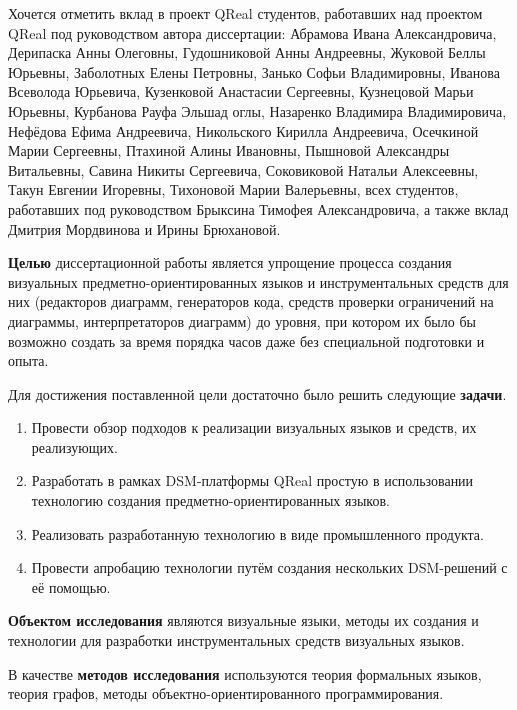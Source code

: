 Хочется отметить вклад в проект QReal студентов, работавших над проектом QReal под руководством автора 
диссертации: Абрамова Ивана Александровича, Дерипаска Анны Олеговны, Гудошниковой Анны Андреевны, 
Жуковой Беллы Юрьевны, Заболотных Елены Петровны, Занько Софьи Владимировны, Иванова Всеволода Юрьевича, 
Кузенковой Анастасии Сергеевны, Кузнецовой Марьи Юрьевны, Курбанова Рауфа Эльшад оглы, 
Назаренко Владимира Владимировича, Нефёдова Ефима Андреевича, Никольского Кирилла Андреевича, 
Осечкиной Марии Сергеевны, Птахиной Алины Ивановны, Пышновой Александры Витальевны, 
Савина Никиты Сергеевича, Соковиковой Натальи Алексеевны, Такун Евгении Игоревны, 
Тихоновой Марии Валерьевны, всех студентов, работавших под руководством Брыксина Тимофея Александровича, 
а также вклад Дмитрия Мордвинова и Ирины Брюхановой.

\textbf{Целью} диссертационной работы является упрощение процесса создания визуальных
предметно-ориентированных языков и инструментальных средств для них (редакторов диаграмм, 
генераторов кода, средств проверки ограничений на диаграммы, интерпретаторов диаграмм)
до уровня, при котором их было бы возможно создать за время порядка часов даже без 
специальной подготовки и опыта.

Для достижения поставленной цели достаточно было решить следующие \textbf{задачи}.
\begin{enumerate}
	\item Провести обзор подходов к реализации визуальных языков и средств, их реализующих.
	\item Разработать в рамках DSM-платформы QReal простую в использовании технологию создания предметно-ориентированных языков.
	\item Реализовать разработанную технологию в виде промышленного продукта.
	\item Провести апробацию технологии путём создания нескольких DSM-решений с её помощью.
\end{enumerate}

\textbf{Объектом исследования} являются визуальные языки, методы их создания и технологии
для разработки инструментальных средств визуальных языков.

В качестве \textbf{методов исследования} используются теория формальных языков, теория графов, 
методы объектно-ориентированного программирования.

